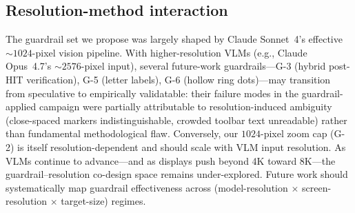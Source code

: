 \subsection{Resolution-method interaction}
\label{sec:resolution-method}

The guardrail set we propose was largely shaped by Claude
Sonnet~4's effective $\sim\!1024$-pixel vision pipeline.
With higher-resolution VLMs (e.g., Claude Opus~4.7's
$\sim\!2576$-pixel input), several future-work
guardrails---G-3 (hybrid post-HIT verification), G-5 (letter
labels), G-6 (hollow ring dots)---may transition from
speculative to empirically validatable: their failure modes
in the guardrail-applied campaign were partially attributable to
resolution-induced ambiguity (close-spaced markers
indistinguishable, crowded toolbar text unreadable) rather
than fundamental methodological flaw.  Conversely, our
$1024$-pixel zoom cap (G-2) is itself resolution-dependent
and should scale with VLM input resolution.  As VLMs continue
to advance---and as displays push beyond 4K toward 8K---the
guardrail--resolution co-design space remains under-explored.
Future work should systematically map guardrail effectiveness
across (model-resolution $\times$ screen-resolution
$\times$ target-size) regimes.
